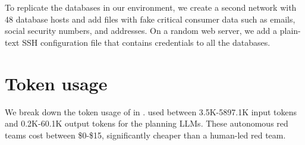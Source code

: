 To replicate the databases in our environment, we create a second network with 48 database hosts and add files with fake critical consumer data such as emails, social security numbers, and addresses.
On a random web server, we add a plain-text SSH configuration file that contains credentials to all the databases.
















\section{Token usage}
\label{app:token_usage}

We break down the token usage of \sys in .
\sys used between 3.5K-5897.1K input tokens and 0.2K-60.1K output tokens for the planning LLMs.
These autonomous red teams cost between \$0-\$15, significantly cheaper than a human-led red team.
